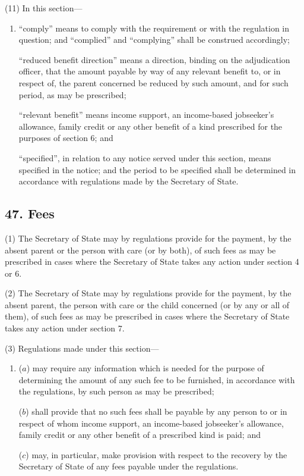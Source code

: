 \documentclass[12pt,a4paper]{article}
\begin{document}
(11) In this section—
\begin{enumerate}\item[]
    “comply” means to comply with the requirement or with the regulation in question; and “complied” and “complying” shall be construed accordingly;

    “reduced benefit direction” means a direction, binding on the adjudication officer, that the amount payable by way of any relevant benefit to, or in respect of, the parent concerned be reduced by such amount, and for such period, as may be prescribed;

    “relevant benefit” means income support, 
an income-based jobseeker’s allowance,  %
family credit or any other benefit of a kind prescribed for the purposes of section 6; and

    “specified”, in relation to any notice served under this section, means specified in the notice; and the period to be specified shall be determined in accordance with regulations made by the Secretary of State. 
\end{enumerate}


\subsection{47. Fees}

(1) The Secretary of State may by regulations provide for the payment, by the absent parent or the person with care (or by both), of such fees as may be prescribed in cases where the Secretary of State takes any action under section 4 or 6.

(2) The Secretary of State may by regulations provide for the payment, by the absent parent, the person with care or the child concerned (or by any or all of them), of such fees as may be prescribed in cases where the Secretary of State takes any action under section 7.

(3) Regulations made under this section—
\begin{enumerate}\item[]
($a$) may require any information which is needed for the purpose of determining the amount of any such fee to be furnished, in accordance with the regulations, by such person as may be prescribed;

($b$) shall provide that no such fees shall be payable by any person to or in respect of whom income support, 
an income-based jobseeker’s allowance,  %
family credit or any other benefit of a prescribed kind is paid; and

($c$) may, in particular, make provision with respect to the recovery by the Secretary of State of any fees payable under the regulations.
\end{enumerate}
\end{document}
